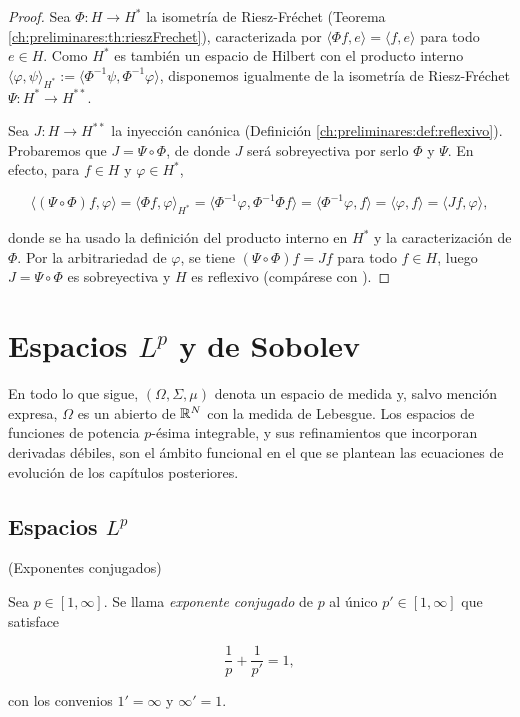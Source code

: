 \begin{proof}
Sea $\Phi : H \rightarrow H^*$ la isometría de Riesz-Fréchet
(Teorema \ref{ch:preliminares:th:rieszFrechet}), caracterizada por
$\langle \Phi f, e \rangle = \langle f, e \rangle$ para todo $e \in H$. Como $H^*$
es también un espacio de Hilbert con el producto interno
$\langle \varphi, \psi \rangle_{H^*} := \langle \Phi^{-1}\psi, \Phi^{-1}\varphi \rangle$,
disponemos igualmente de la isometría de Riesz-Fréchet
$\Psi : H^* \rightarrow H^{**}$.

Sea $J : H \rightarrow H^{**}$ la inyección canónica
(Definición \ref{ch:preliminares:def:reflexivo}). Probaremos que
$J = \Psi \circ \Phi$, de donde $J$ será sobreyectiva por serlo $\Phi$ y $\Psi$.
En efecto, para $f \in H$ y $\varphi \in H^*$,

\[\langle (\Psi \circ \Phi) f, \varphi \rangle = \langle \Phi f, \varphi \rangle_{H^*} = \langle \Phi^{-1}\varphi, \Phi^{-1}\Phi f \rangle = \langle \Phi^{-1}\varphi, f \rangle = \langle \varphi, f \rangle = \langle J f, \varphi \rangle,\]

donde se ha usado la definición del producto interno en $H^*$ y la
caracterización de $\Phi$. Por la arbitrariedad de $\varphi$, se tiene
$(\Psi \circ \Phi)f = Jf$ para todo $f \in H$, luego $J = \Psi \circ \Phi$ es
sobreyectiva y $H$ es reflexivo (compárese con \cite[Cap.~5]{brezis-2011-fun-ana-sob}).
\end{proof}

\section{Espacios $L^p$ y de Sobolev}
\label{ch:preliminares:section:sobolev}

En todo lo que sigue, $(\Omega, \Sigma, \mu)$ denota un espacio de medida y, salvo
mención expresa, $\Omega$ es un abierto de $\mathbb{R}^N$ con la medida de Lebesgue. Los
espacios de funciones de potencia $p$-ésima integrable, y sus refinamientos que
incorporan derivadas débiles, son el ámbito funcional en el que se plantean las
ecuaciones de evolución de los capítulos posteriores.

\subsection{Espacios $L^p$}
\label{ch:preliminares:subsection:Lp}

\begin{Definicion}{(Exponentes conjugados)}
\label{ch:preliminares:def:conjugados}

Sea $p \in [1, \infty]$. Se llama \textit{exponente conjugado} de $p$ al único
$p' \in [1, \infty]$ que satisface

\[\frac{1}{p} + \frac{1}{p'} = 1,\]

con los convenios $1' = \infty$ y $\infty' = 1$.
\end{Definicion}

